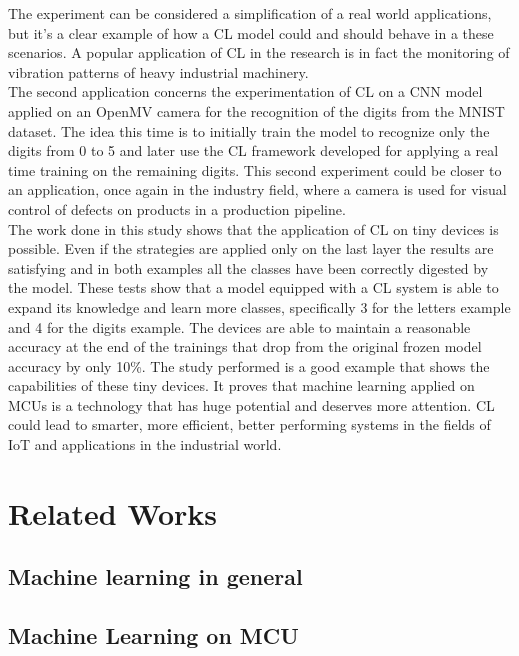 \documentclass[12pt]{report}
\begin{document}
The experiment can be considered a simplification of a real world applications, but it's a clear example of how a CL model could and should behave in a these scenarios. A popular application of CL in the research is in fact the monitoring of vibration patterns of heavy industrial machinery. \\
The second application concerns the experimentation of CL on a CNN model applied on an OpenMV camera for the recognition of the digits from the MNIST dataset. The idea this time is to initially train the model to recognize only the digits from 0 to 5 and later use the CL framework developed for applying a real time training on the remaining digits. This second experiment could be closer to an application, once again in the industry field, where a camera is used for visual control of defects on products in a production pipeline.  \\
The work done in this study shows that the application of CL on tiny devices is possible. Even if the strategies are applied only on the last layer the results are satisfying and in both examples all the classes have been correctly digested by the model. These tests show that a model equipped with a CL system is able to expand its knowledge and learn more classes, specifically 3 for the letters example and 4 for the digits example. The devices are able to maintain a reasonable accuracy at the end of the trainings that drop from the original frozen model accuracy by only 10\%. 
The study performed is a good example that shows the capabilities of these tiny devices. It proves that machine learning applied on MCUs is a technology that has huge potential and deserves more attention. CL could lead to smarter, more efficient, better performing systems in the fields of IoT and applications in the industrial world.
\bigskip



\chapter{Related Works}


\section{Machine learning in general}


\section{Machine Learning on MCU}
\end{document}
